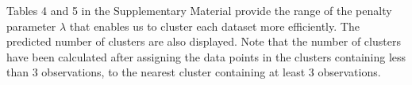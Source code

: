 \documentclass{article}
\begin{document}
Tables 4 and 5 in the Supplementary Material provide the range of the penalty parameter $\lambda$ that enables us to cluster each dataset more efficiently. The predicted number of clusters are also displayed. Note that the number of clusters have been calculated after assigning the data points in the clusters containing less than $3$ observations, to the nearest cluster containing at least $3$ observations. 

\end{document}
